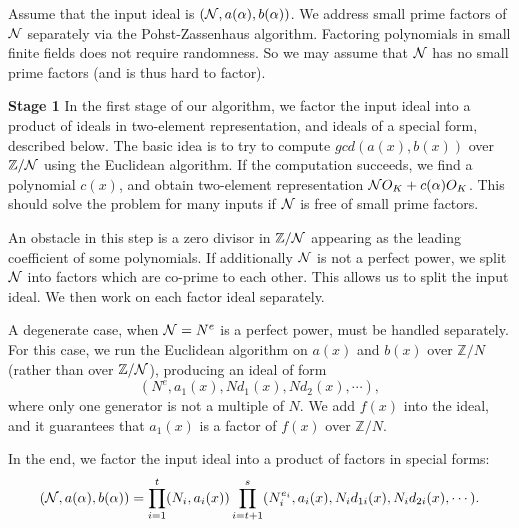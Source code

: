 \documentclass[runningheads, letter]{llncs}
\newcommand{\Z}{{\mathbb Z}}
\begin{document}
Assume that the input ideal is \( ({\cal N}, a(\alpha), b(\alpha)) \).
We address small prime factors of \( {\cal N} \) separately
via the Pohst-Zassenhaus algorithm.
Factoring polynomials in small finite fields does not
require randomness. So we may assume that \( {\cal N} \)
has no small prime factors (and is thus hard to factor).

{\bf Stage 1}
In the first stage of our algorithm, we factor the input ideal
into a product of ideals in two-element representation,
and ideals of a special form, described below.
The basic idea is to try to compute \( gcd(a(x), b(x)) \) 
over \( \Z/{\cal N} \) using the Euclidean algorithm. 
%
%
%
If the computation succeeds, we find a polynomial \( c (x) \),
and obtain two-element representation
\( {\cal N} O_K + c(\alpha) O_K \).
This should solve the problem for many inputs if \( {\cal N} \)
is free of small prime factors.
%
%

An obstacle in this step is a zero divisor in \( \Z/{\cal N} \)
appearing as the leading coefficient of some polynomials.
If additionally \( {\cal N} \) is not a perfect power,
we split \( {\cal N}  \) into factors which are co-prime
to each other.
%
This allows us to split the input
ideal. We then work on each factor ideal separately.
%

A degenerate case, when \( {\cal N} = N^e \) 
is a perfect power, must be handled separately.
For this case, we  run the Euclidean algorithm
on \( a(x) \) and \( b(x) \) over \( \Z/{N} \)
(rather than over \( \Z/{\cal N} \)), 
producing an ideal of form
\begin{equation}\label{eq:onegennotN}
 (N^e, a_1 (x), N d_1(x), N d_2(x), \cdots ),
\end{equation}
where only one  generator is not a multiple of
\( N \). We add \( f(x) \) into the ideal, and
it guarantees that \( a_1(x) \) is a factor of \( f(x) \)
over \( \Z/N \).

In the end, we factor the input ideal into
a product of factors in special forms:
\[ ({\cal N}, a(\alpha), b(\alpha))=
  \prod_{i=1}^t (N_i, a_i (x)) \prod_{i=t+1}^s (N_i^{e_i}, a_i (x),
  N_i d_{ 1 i}(x), N_i d_{ 2 i}(x), \cdots).\]
\end{document}
